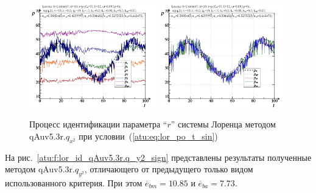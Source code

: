\begin{figure}[h!]
  \centerline{
    \includegraphics[width=0.49\textwidth]{p/cha/lor/qAuv5.3r/lor_qAuv5_3r_qy2-p_t_pi_sin.png}
    \hfill
    \includegraphics[width=0.49\textwidth]{p/cha/lor/qAuv5.3r/lor_qAuv5_3r_qy2-p_t_pz_sin.png}
  }
  \caption{Процесс идентификации параметра ``$r$'' системы Лоренца методом qAuv5.3r.$q_{x^2}$ при условии~(\ref{atu:eq:lor_po_t_sin})}
  \label{atu:f:lor_id_qAuv5.3r.q_x2_sin}
\end{figure}


На рис.~\ref{atu:f:lor_id_qAuv5.3r.q_y2_sign} представлены результаты
полученные методом qAuv5.3r.$q_{y^2}$,
отличающего от предыдущего только видом использованного критерия.
При этом
$\overline{e}_{bm}=10.85$
и
$\overline{e}_{ba}=7.73$.

